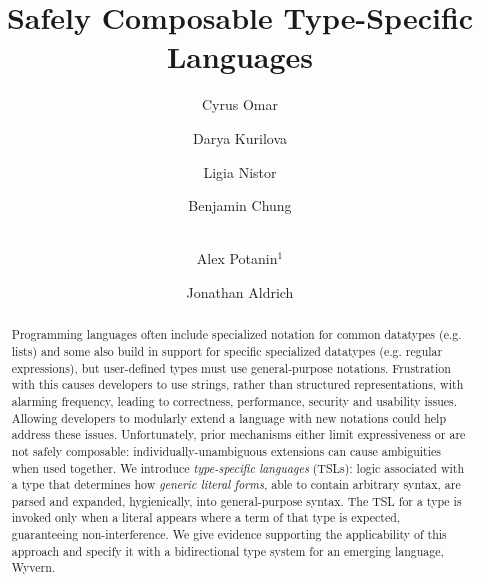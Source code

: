 \documentclass[runningheads]{llncs}
\begin{document}
\title{Safely Composable Type-Specific Languages}
\author{Cyrus Omar \and Darya Kurilova \and Ligia Nistor \and Benjamin Chung \and\\
Alex Potanin$^{1}$ \and Jonathan Aldrich}

\maketitle

\begin{abstract}
Programming languages often include specialized notation for common datatypes (e.g. lists) and some also build in support for specific specialized datatypes (e.g. regular expressions), but user-defined types must use general-purpose notations. Frustration with this causes developers to use strings, rather than structured representations, with alarming frequency, leading to correctness, performance, security and usability  issues.
Allowing developers to modularly extend a language with new notations could help address these issues. Unfortunately, prior mechanisms either limit expressiveness or are not safely composable: individually-unambiguous extensions can cause ambiguities when used together. We introduce \emph{type-specific languages} (TSLs):  logic associated with a type that determines how \emph{generic literal forms}, able to contain arbitrary syntax, are parsed and expanded, hygienically, into general-purpose syntax. The TSL for a type is invoked only when a literal appears where a term of that type is expected, guaranteeing non-interference. We give evidence supporting the applicability of  this approach and specify it with a bidirectional type system for an emerging language, Wyvern.


\end{abstract}
\end{document}
